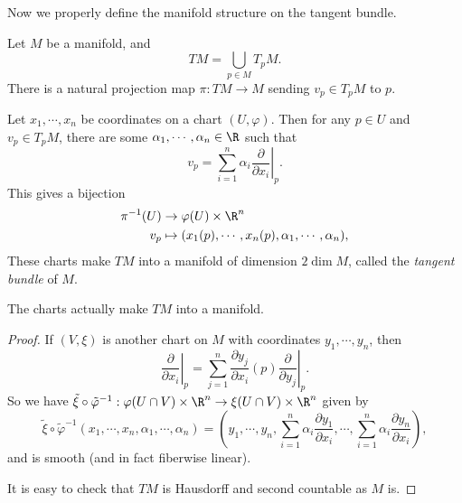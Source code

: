\documentclass[a4paper]{article}
\begin{document}
Now we properly define the manifold structure on the tangent bundle.

\begin{defi}
  Let $M$ be a manifold, and
  \[
    TM = \bigcup_{p \in M}T_p M.
  \]
  There is a natural projection map $\pi: TM \to M$ sending $v_p \in T_pM$ to $p$.

  Let $x_1, \cdots, x_n$ be coordinates on a chart $(U, \varphi)$. Then for any $p \in U$ and $v_p \in T_p M$, there are some $\alpha_1, \cdots, \alpha_n \in \R$ such that
  \[
    v_p = \sum_{i = 1}^n \alpha_i \left.\frac{\partial}{\partial x_i}\right|_{p}.
  \]
  This gives a bijection
  \begin{align*}
    \pi^{-1}(U) &\to \varphi(U) \times \R^n\\
    v_p &\mapsto (x_1(p), \cdots, x_n(p), \alpha_1, \cdots, \alpha_n),
  \end{align*}
  These charts make $TM$ into a manifold of dimension $2 \dim M$, called the \emph{tangent bundle} of $M$.
\end{defi}

\begin{lemma}
  The charts actually make $TM$ into a manifold.
\end{lemma}

\begin{proof}
  If $(V, \xi)$ is another chart on $M$ with coordinates $y_1, \cdots, y_n$, then
  \[
    \left.\frac{\partial}{\partial x_i}\right|_p = \sum_{j = 1}^n \frac{\partial y_j}{\partial x_i}(p) \left.\frac{\partial}{\partial y_j}\right|_p.
  \]
  So we have $\tilde{\xi} \circ \tilde{\varphi}^{-1}: \varphi(U \cap V) \times \R^n \to \xi(U \cap V) \times \R^n$ given by
  \[
    \tilde{\xi} \circ \tilde{\varphi}^{-1} (x_1, \cdots, x_n, \alpha_1, \cdots, \alpha_n) = \left(y_1, \cdots, y_n, \sum_{i = 1}^n \alpha_i \frac{\partial y_{1}}{\partial x_i}, \cdots, \sum_{i = 1}^n \alpha_i \frac{\partial y_n}{\partial x_i}\right),
  \]
  and is smooth (and in fact fiberwise linear).

  It is easy to check that $TM$ is Hausdorff and second countable as $M$ is.
\end{proof}
\end{document}
